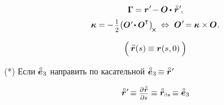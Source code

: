\begin{otherlanguage}{russian}
\nopagebreak\vspace{-0.2em}\begin{gather}
\bm{\Gamma} \hspace{-0.1ex} = \currentlocationvector{\hspace{.1ex}'} \hspace{-0.3ex} - \rotationtensor \hspace{-0.1ex} \dotp \hspace{.15ex} \initiallocationvector{\hspace{.1ex}'}
\hspace{-0.25ex} ,
\label{cosseratrod.firstdeformationvector}
\\[.1em]
%
\bm{\kappa} \hspace{-0.1ex} = \hspace{-0.1ex} - \hspace{.25ex} \smalldisplaystyleonehalf \scalebox{.96}{$ \bigl( \rotationtensor{\hspace{.15ex}'} \hspace{-0.3ex} \dotp \rotationtensor^{\T} \hspace{.1ex} \bigr)_{\hspace{-0.3ex}\Xcompanion} $}
\hspace{.25em} \Leftrightarrow \hspace{.3em}
\rotationtensor{\hspace{.15ex}'} \hspace{-0.33ex} = \bm{\kappa} \times \hspace{-0.1ex} \rotationtensor
\hspace{.1ex} .
\label{cosseratrod.seconddeformationvector}
\end{gather}

\begin{equation*}
\Bigl( \hspace{.2em}
\initiallocationvector(s) \hspace{-0.1ex}
\equiv
\currentlocationvector(s, 0)
\hspace{.2em} \Bigr)
\vspace{-0.2em}
\end{equation*}

(*) Если ${\mathcircabove{\bm{e}}_3}$ направить по касательной ${\mathcircabove{\bm{e}}_3 \hspace{-0.2ex} \equiv \initiallocationvector{\hspace{.1ex}'}}$

\nopagebreak\begin{equation*}
\initiallocationvector{\hspace{.1ex}'} \hspace{-0.3ex}
\equiv \scalebox{.8}{$ \displaystyle\frac{\raisemath{-0.15em}{\partial \hspace{.15ex} \initiallocationvector}}{\partial s} $}
\equiv \initiallocationvector_\differentialindex{s} \hspace{-0.2ex}
\equiv \mathcircabove{\bm{e}}_3
\end{equation*}


\end{otherlanguage}
